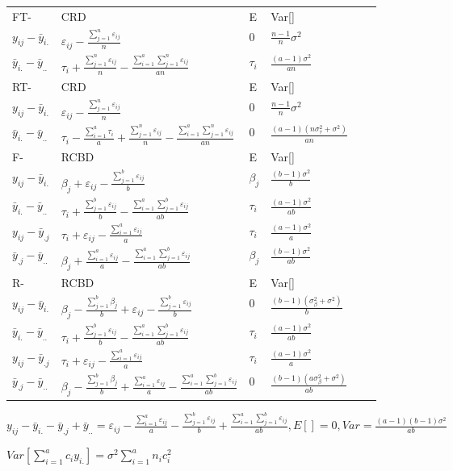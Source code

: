 \documentclass[10pt,portrait]{article}
\begin{document}
\begin{multicols}{2}
\begin{tabular}{l|l|l|l|l|l}
FT- &CRD & E & Var[]\\
$y_{ij}-\bar y_{i.}$ & $\varepsilon_{ij}-\frac{\sum_{j=1}^n\varepsilon_{ij}}n$ & $0$ & $\frac{n-1}n\sigma^2$\\
$\bar y_{i.}-\bar y_{..}$ & $\tau_{i}+\frac{\sum_{j=1}^n\varepsilon_{ij}}n-\frac{\sum_{i=1}^a\sum_{j=1}^n\varepsilon_{ij}}{an}$ & $\tau_i$ & $\frac{(a-1)\sigma^2}{an}$\\
\hline
RT- &CRD & E & Var[]\\
$y_{ij}-\bar y_{i.}$ & $\varepsilon_{ij}-\frac{\sum_{j=1}^n\varepsilon_{ij}}n$ & $0$ & $\frac{n-1}n\sigma^2$\\
$\bar y_{i.}-\bar y_{..}$ & $\tau_{i}-\frac{\sum_{i=1}^a\tau_{i}}{a}+\frac{\sum_{j=1}^n\varepsilon_{ij}}n-\frac{\sum_{i=1}^a\sum_{j=1}^n\varepsilon_{ij}}{an}$ & $0$ & $\frac{(a-1)(n\sigma_{\tau}^2+\sigma^2)}{an}$\\
\hline
F- &RCBD & E & Var[]\\
$y_{ij}-\bar y_{i.}$ & $\beta_{j}+\varepsilon_{ij}-\frac{\sum_{j=1}^b\varepsilon_{ij}}b$ & $\beta_j$ & $\frac{(b-1)\sigma^2}b$\\
$\bar y_{i.}-\bar y_{..}$ & $\tau_{i}+\frac{\sum_{j=1}^b\varepsilon_{ij}}b-\frac{\sum_{i=1}^a\sum_{j=1}^b\varepsilon_{ij}}{ab}$ & $\tau_i$ & $\frac{(a-1)\sigma^2}{ab}$\\
$y_{ij}-\bar y_{.j}$ & $\tau_{i}+\varepsilon_{ij}-\frac{\sum_{i=1}^a\varepsilon_{ij}}a$ & $\tau_i$ & $\frac{(a-1)\sigma^2}a$\\
$\bar y_{.j}-\bar y_{..}$ & $\beta_{j}+\frac{\sum_{i=1}^a\varepsilon_{ij}}a-\frac{\sum_{i=1}^a\sum_{j=1}^b\varepsilon_{ij}}{ab}$ & $\beta_j$ & $\frac{(b-1)\sigma^2}{ab}$\\
\hline
R- &RCBD & E & Var[]\\
$y_{ij}-\bar y_{i.}$ & $\beta_{j}-\frac{\sum_{j=1}^b\beta_{j}}b+\varepsilon_{ij}-\frac{\sum_{j=1}^b\varepsilon_{ij}}b$ & $0$ & $\frac{(b-1)(\sigma_{\beta}^2+\sigma^2)}b$\\
$\bar y_{i.}-\bar y_{..}$ & $\tau_{i}+\frac{\sum_{j=1}^b\varepsilon_{ij}}b-\frac{\sum_{i=1}^a\sum_{j=1}^b\varepsilon_{ij}}{ab}$ & $\tau_i$ & $\frac{(a-1)\sigma^2}{ab}$\\
$y_{ij}-\bar y_{.j}$ & $\tau_{i}+\varepsilon_{ij}-\frac{\sum_{i=1}^a\varepsilon_{ij}}a$ & $\tau_i$ & $\frac{(a-1)\sigma^2}a$\\
$\bar y_{.j}-\bar y_{..}$ & $\beta_j-\frac{\sum_{j=1}^b\beta_j}{b}+\frac{\sum_{i=1}^a\varepsilon_{ij}}a-\frac{\sum_{i=1}^a\sum_{j=1}^b\varepsilon_{ij}}{ab}$ & $0$ & $\frac{(b-1)(a\sigma_{\beta}^2+\sigma^2)}{ab}$\\
\end{tabular}

$y_{ij}-\bar y_{i.}-\bar y_{.j}+\bar y_{..}=\varepsilon_{ij}-\frac{\sum_{i=1}^a\varepsilon_{ij}}a-\frac{\sum_{j=1}^b\varepsilon_{ij}}b+\frac{\sum_{i=1}^a\sum_{j=1}^b\varepsilon_{ij}}{ab},E[]=0, Var=\frac{(a-1)(b-1)\sigma^2}{ab}$

$Var\left[\sum^{a}_{i=1}c_iy_{i.}\right]=\sigma^2\sum^{a}_{i=1}n_ic_i^2$

\end{multicols}
\end{document}
